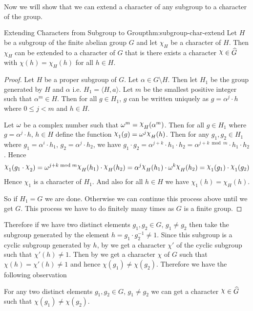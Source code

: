 Now we will show that we can extend a character of any subgroup to a character of the group.
\begin{Theorem}{Extending Characters from Subgroup to Group}{thm:subgroup-char-extend}
  Let $H$ be a subgroup of the finite abelian group $G$ and let $\chi_H$ be a character of $H$. Then $\chi_H$ can be extended to a character of $G$ that is there exists a character $\chi\in\hG$ with $\chi(h)=\chi_H(h)$ for all $h\in H$.
\end{Theorem}
\begin{proof}
  Let $H$ be a proper subgroup of $G$. Let $\alpha\in G\setminus H$. Then let $H_1$ be the group generated by $H$ and $\alpha$ i.e. $H_1=\langle H,a\rangle$. Let $m$ be the smallest positive integer such that $\alpha^m\in H$. Then for all $g\in H_1$, $g$ can be written uniquely as $g=\alpha^j\cdot h$ where $0\leq j<m$ and $h\in H$.

  Let $\omega$ be a complex number such that $\om^m=\chi_H(\alpha^m)$. Then for all $g\in H_1$ where $g=\alpha^j\cdot h$, $h\in H$ define the function $\chi_1(g)=\om^j \chi_H(h)$. Then for any $g_1,g_2\in H_1$ where $g_1=\alpha^i\cdot h_1$, $g_2=\alpha^j\cdot h_2$, we have $g_1\cdot g_2=\alpha^{j+k}\cdot h_1\cdot h_2=\alpha^{j+k\bmod{m}}\cdot h_1\cdot h_2$. Hence $$\chi_1(g_1\cdot \chi_2)=\om^{j+k \bmod{m}}\chi_H(h_1)\cdot \chi_H(h_2)=\alpha^j\chi_H(h_1)\cdot \om^k\chi_H(h_2)=\chi_1(g_1)\cdot \chi_1(g_2)$$Hence $\chi_1$ is a character of $H_1$. And also for all $h\in H$ we have $\chi_1(h)=\chi_H(h)$.

  So if $H_1=G$ we are done. Otherwise we can continue this process above until we get $G$. This process we have to do finitely many times as $G$ is a finite group.
\end{proof}


Therefore if we have two distinct elements $g_1,g_2\in G$, $g_1\neq g_2$ then take the subgroup generated by the element $h=g_1\cdot g_2^{-1}\neq 1$. Since this subgroup is a cyclic subgroup generated by $h$, by  we get a character $\chi'$ of the cyclic subgroup such that $\chi'(h)\neq 1$. Then by  we get a character $\chi$ of $G$ such that $\chi(h)=\chi'(h)\neq 1$ and hence $\chi(g_1)\neq \chi(g_2)$. Therefore we have the following observation
\begin{observation}
  For any two distinct elements $g_1,g_2\in G$, $g_1\neq g_2$ we can get a character $\chi\in\hG$ such that $\chi(g_1)\neq \chi(g_2)$.
\end{observation}

